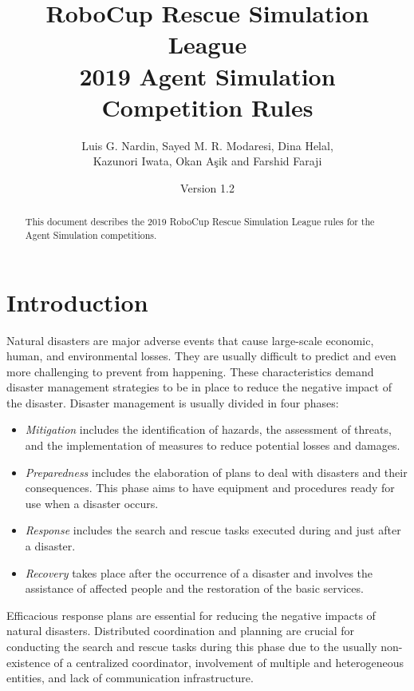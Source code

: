 \documentclass{article}
\begin{document}

\title{RoboCup Rescue Simulation League\\
       2019 Agent Simulation Competition Rules}
\author{Luis G. Nardin, Sayed M. R. Modaresi, Dina Helal,\\
Kazunori Iwata, Okan A{\c s}ik and Farshid Faraji}
\date{Version 1.2}
\maketitle
\begin{abstract}
This document describes the 2019 RoboCup Rescue Simulation League rules for the Agent Simulation competitions.
\end{abstract}
\section{Introduction}
\label{sec:introduction}
Natural disasters are major adverse events that cause large-scale economic, human, and environmental losses. They are usually difficult to predict and even more challenging to prevent from happening. These characteristics demand disaster management strategies to be in place to reduce the negative impact of the disaster. Disaster management is usually divided in four phases:
\begin{itemize}
\item \emph{Mitigation} includes the identification of hazards, the assessment of threats, and the implementation of measures to reduce potential losses and damages.
\item \emph{Preparedness} includes the elaboration of plans to deal with disasters and their consequences. This phase aims to have equipment and procedures ready for use when a disaster occurs.
\item \emph{Response} includes the search and rescue tasks executed during and just after a disaster.
\item \emph{Recovery} takes place after the occurrence of a disaster and involves the assistance of affected people and the restoration of the basic services.
\end{itemize}

Efficacious response plans are essential for reducing the negative impacts of natural disasters. Distributed coordination and planning are crucial for conducting the search and rescue tasks during this phase due to the usually non-existence of a centralized coordinator, involvement of multiple and heterogeneous entities, and lack of communication infrastructure.
\end{document}
